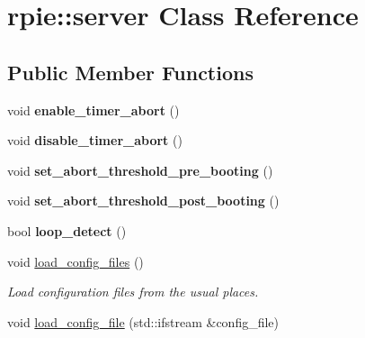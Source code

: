 \hypertarget{classrpie_1_1server}{\section{rpie\-:\-:server Class Reference}
\label{classrpie_1_1server}
}
\subsection*{Public Member Functions}
\begin{DoxyCompactItemize}
\item 
\hypertarget{classrpie_1_1server_a0878d4b792bf0419e9771260734259f3}{void {\bfseries enable\-\_\-timer\-\_\-abort} ()}\label{classrpie_1_1server_a0878d4b792bf0419e9771260734259f3}

\item 
\hypertarget{classrpie_1_1server_a7dbbbef5b5fc6a5a2e9de920e656c3ab}{void {\bfseries disable\-\_\-timer\-\_\-abort} ()}\label{classrpie_1_1server_a7dbbbef5b5fc6a5a2e9de920e656c3ab}

\item 
\hypertarget{classrpie_1_1server_a00a169982369b9b421d088a282cc0e97}{void {\bfseries set\-\_\-abort\-\_\-threshold\-\_\-pre\-\_\-booting} ()}\label{classrpie_1_1server_a00a169982369b9b421d088a282cc0e97}

\item 
\hypertarget{classrpie_1_1server_a89750323d0889e6fd34072577cc8ddea}{void {\bfseries set\-\_\-abort\-\_\-threshold\-\_\-post\-\_\-booting} ()}\label{classrpie_1_1server_a89750323d0889e6fd34072577cc8ddea}

\item 
\hypertarget{classrpie_1_1server_adc04d858a407001f5bf907cad65255eb}{bool {\bfseries loop\-\_\-detect} ()}\label{classrpie_1_1server_adc04d858a407001f5bf907cad65255eb}

\item 
\hypertarget{classrpie_1_1server_a6bed490717d2450853502414d32bb6a9}{void \hyperlink{classrpie_1_1server_a6bed490717d2450853502414d32bb6a9}{load\-\_\-config\-\_\-files} ()}\label{classrpie_1_1server_a6bed490717d2450853502414d32bb6a9}

\begin{DoxyCompactList}\small\item\em Load configuration files from the usual places. \end{DoxyCompactList}\item 
\hypertarget{classrpie_1_1server_a777008330eb6140447cc7f83aac3173d}{void \hyperlink{classrpie_1_1server_a777008330eb6140447cc7f83aac3173d}{load\-\_\-config\-\_\-file} (std\-::ifstream \&config\-\_\-file)}\label{classrpie_1_1server_a777008330eb6140447cc7f83aac3173d}


\end{DoxyCompactItemize}
